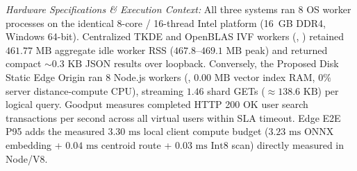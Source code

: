 \documentclass[11pt,journal,compsoc,onecolumn]{IEEEtran}
\begin{document}
\begin{table}[H]
\begin{minipage}{\textwidth}
\vspace{4pt}
\footnotesize{\textit{Hardware Specifications \& Execution Context:} All three systems ran 8 OS worker processes on the identical 8-core / 16-thread Intel platform (16~GB DDR4, Windows 64-bit). Centralized TKDE and OpenBLAS IVF workers (, ) retained $461.77\text{ MB}$ aggregate idle worker RSS ($467.8\text{--}469.1\text{ MB}$ peak) and returned compact $\sim 0.3\text{ KB}$ JSON results over loopback. Conversely, the Proposed Disk Static Edge Origin ran 8 Node.js workers (, $0.00\text{ MB}$ vector index RAM, $0\%$ server distance-compute CPU), streaming $1.46$ shard GETs ($\approx 138.6\text{ KB}$) per logical query. Goodput measures completed HTTP 200 OK user search transactions per second across all virtual users within SLA timeout. Edge E2E P95 adds the measured $3.30\text{ ms}$ local client compute budget ($3.23\text{ ms}$ ONNX embedding + $0.04\text{ ms}$ centroid route + $0.03\text{ ms}$ $\text{Int8}$ scan) directly measured in Node/V8.}
\end{minipage}
\end{table}
\end{document}
